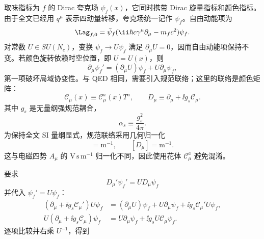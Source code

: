 取味指标为 $f$ 的 Dirac 夸克场 \(\psi_f(x)\)，它同时携带 Dirac 旋量指标和颜色指标。由于全文已经用 \(q^\mu\) 表示四动量转移，夸克场统一记作 \(\psi_f\)。自由动能项为
\begin{equation}
 \Lag_{f,0}=\bar\psi_f(\ii\hbar c\gamma^\mu\partial_\mu-m_fc^2)\psi_f.
 \label{eq:free-quark-lagrangian-dp10}
\end{equation}
对常数 \(U\in SU(N_c)\)，变换 \(\psi_f\to U\psi_f\) 满足 \(\partial_\mu U=0\)，因而自由动能项保持不变。若颜色旋转依赖时空位置，即 \(U=U(x)\)，则
\begin{equation*}
 \partial_\mu \psi_f'
 =(\partial_\mu U)\psi_f+U\partial_\mu \psi_f,
\end{equation*}
第一项破坏局域协变性。与 QED 相同，需要引入规范联络；这里的联络是颜色矩阵：
\begin{equation*}
 \mathscr C_\mu(x)
 \equiv\mathscr C_\mu^a(x)T^a,
 \qquad
 D_\mu\equiv\partial_\mu+\ii g_s\mathscr C_\mu.
\end{equation*}
其中 \(g_s\) 是无量纲强规范耦合，
\begin{equation}
 \alpha_s\equiv\frac{g_s^2}{4\pi}.
 \label{eq:alpha-s-definition-dp10}
\end{equation}
为保持全文 SI 量纲显式，规范联络采用几何归一化
\begin{equation*}
 [\mathscr C_\mu]=\mathrm{m^{-1}},
 \qquad [D_\mu]=\mathrm{m^{-1}}.
\end{equation*}
这与电磁四势 \(A_\mu\) 的 \(\mathrm{V\,s\,m^{-1}}\) 归一化不同，因此使用花体 \(\mathscr C_\mu^a\) 避免混淆。

要求
\begin{equation}
 D_\mu'\psi_f'=U D_\mu\psi_f
 \label{eq:qcd-covariance-requirement-dp10}
\end{equation}
并代入 \(\psi_f'=U\psi_f\)：
\begin{align*}
 (\partial_\mu+\ii g_s\mathscr C_\mu')U\psi_f
 &=(\partial_\mu U)\psi_f+U\partial_\mu\psi_f
 +\ii g_s\mathscr C_\mu'U\psi_f,\\
 U(\partial_\mu+\ii g_s\mathscr C_\mu)\psi_f
 &=U\partial_\mu\psi_f+\ii g_sU\mathscr C_\mu\psi_f.
\end{align*}
逐项比较并右乘 \(U^{-1}\)，得到


